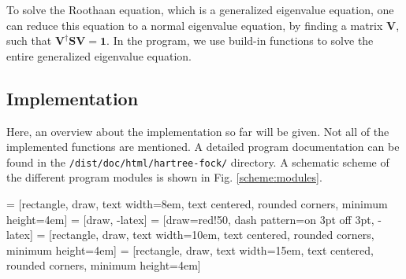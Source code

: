\documentclass[twoside,        %
			   11pt,			%
               BCOR10mm,       %
               ngerman,english  %
               ]{scrartcl}
\begin{document}
\pagebreak
To solve the Roothaan equation, which is a generalized eigenvalue equation, one can reduce this equation to a normal eigenvalue equation, by finding a matrix $\mathbf{V}$, such that $\mathbf{V}^\dagger\mathbf{S}\mathbf{V} = \mathbf{1}$. In the program, we use build-in functions to solve the entire generalized eigenvalue equation.

\subsection{Implementation}
Here, an overview about the implementation so far will be given. Not all of the implemented functions are mentioned. A detailed program documentation can be found in the \texttt{/dist/doc/html/hartree-fock/} directory. A schematic scheme of the different program modules is shown in Fig. \ref{scheme:modules}.


 = [rectangle, draw,  text width=8em, text centered, rounded corners, minimum height=4em]
 = [draw, -latex]
 = [draw=red!50, dash pattern=on 3pt off 3pt, -latex]
 = [rectangle, draw, text width=10em, text centered, rounded corners, minimum height=4em]
 = [rectangle, draw, text width=15em, text centered, rounded corners, minimum height=4em]
\end{document}
